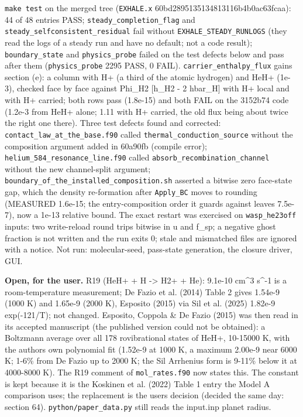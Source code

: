 \documentclass[english,a4paper]{my_memo}
\begin{document}
\texttt{make\ test} on the merged tree (\texttt{EXHALE.x} 60bd2895135134813116b4b0ac63fcaa):
44 of 48 entries PASS; \texttt{steady\_completion\_flag} and
\texttt{steady\_selfconsistent\_residual} fail without \texttt{EXHALE\_STEADY\_RUNLOGS} (they
read the logs of a steady run and have no default; not a code result);
\texttt{boundary\_state} and \texttt{physics\_probe} failed on the test defects below and
pass after them (\texttt{physics\_probe} 2295 PASS, 0 FAIL). \texttt{carrier\_enthalpy\_flux}
gains section (e): a column with H+ (a third of the atomic hydrogen) and
HeH+ (1e-3), checked face by face against Phi\_H2 {[}h\_H2 - 2 hbar\_H{]} with H+
local and with H+ carried; both rows pass (1.8e-15) and both FAIL on the
3152b74 code (1.2e-3 from HeH+ alone; 1.11 with H+ carried, the old flux
being about twice the right one there). Three test defects found and
corrected: \texttt{contact\_law\_at\_the\_base.f90} called
\texttt{thermal\_conduction\_source} without the composition argument added in
60a90fb (compile error); \texttt{helium\_584\_resonance\_line.f90} called
\texttt{absorb\_recombination\_channel} without the new channel-split argument; \texttt{boundary\_of\_the\_installed\_composition.sh}
asserted a bitwise zero face-state gap, which the density re-formation
after \texttt{Apply\_BC} moves to rounding (MEASURED 1.6e-15; the entry-composition
order it guards against leaves 7.5e-7), now a 1e-13 relative bound.
The exact restart was exercised on \texttt{wasp\_he23off} inputs: two write-reload
round trips bitwise in u and f\_sp; a negative ghost fraction is not written
and the run exits 0; stale and mismatched files are ignored with a notice.
Not run: molecular-seed, pass-state generation, the closure driver, GUI.

\textbf{Open, for the user.} R19 (HeH+ + H -\textgreater{} H2+ + He): 9.1e-10 cm\^{}3 s\^{}-1 is a
room-temperature measurement; De Fazio et al. (2014) Table 2 gives 1.54e-9
(1000 K) and 1.65e-9 (2000 K), Esposito (2015) via Sil et al. (2025)
1.82e-9 exp(-121/T); not changed. Esposito, Coppola \& De Fazio (2015) was
then read in its accepted manuscript (the published version could not be
obtained): a Boltzmann average over all 178 rovibrational states of HeH+,
10-15000 K, with the authors\textquotesingle{} own polynomial fit (1.52e-9 at 1000 K, a
maximum 2.00e-9 near 6000 K; 1-6\% from De Fazio up to 2000 K; the Sil
Arrhenius form is 9-11\% below it at 4000-8000 K). The R19 comment of
\texttt{mol\_rates.f90} now states this. The constant is kept because it is the
Koskinen et al. (2022) Table 1 entry the Model A comparison uses; the
replacement is the user\textquotesingle s decision (decided the same day: section 64). \texttt{python/paper\_data.py} still reads the
input.inp planet radius.
\end{document}
